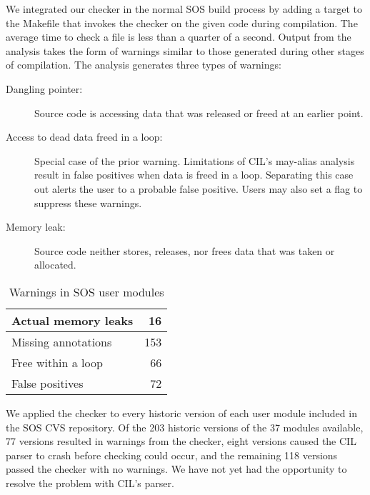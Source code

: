 We integrated our checker in the normal SOS build process by
adding a target to the Makefile that invokes the checker on the given code
during compilation.
The average time to check a file is less than a quarter of a second.
Output from the analysis takes the form of warnings similar to those generated
during other stages of compilation.
%
The analysis generates three types of warnings:
%
\begin{description}
%
\item[Dangling pointer:] Source code is accessing data that was
released or freed at an earlier point.
%
\item[Access to dead data freed in a loop:] Special case of the prior warning.
Limitations of CIL's may-alias analysis result in
false positives when data is freed in a loop.  Separating this case out alerts
the user to a probable false positive.  Users may also set a flag
to suppress these warnings.
%
\item[Memory leak:] Source code neither stores, releases, nor frees
data that was taken or allocated.
%
%
\end{description}
%

\begin{table}
\caption{Warnings in SOS user modules}
%
\label{tab:module}
\centering 
\begin{tabular}{| l | r |}
    \hline 
    Actual memory leaks & 16 \\
    \hline
    Missing annotations & 153 \\
    \hline 
    Free within a loop & 66 \\
    \hline 
    False positives & 72 \\
    \hline 
\end{tabular} 
%
\end{table}

We applied the checker to every historic version of
each user module included in the SOS CVS repository.  Of the 203 historic versions
of the 37 modules available, 77 versions resulted in
warnings from the checker, eight versions caused 
 the CIL parser to crash before checking could occur, and the
 remaining 118 versions passed the checker with no warnings.
We have not yet had the opportunity to resolve the problem with CIL's
parser.

